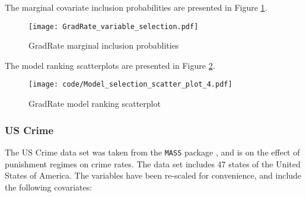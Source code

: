 \documentclass{amsart}[12pt]
\begin{document}
The marginal covariate inclusion probabilities are presented in Figure \ref{fig:GradRate_inclusion}.


\begin{figure}[p]
	\texttt{[image: GradRate\_variable\_selection.pdf]}
	\caption{GradRate marginal inclusion probablities}
	\label{fig:GradRate_inclusion}
\end{figure}

The model ranking scatterplots are presented in Figure \ref{fig:GradRate_model_ranking}.

\begin{figure}[p]
	\texttt{[image: code/Model\_selection\_scatter\_plot\_4.pdf]}
	\caption{GradRate model ranking scatterplot}
	\label{fig:GradRate_model_ranking}
\end{figure}

\subsubsection{US Crime}
The US Crime data set was taken from the \texttt{MASS} package \citep{Venables2002}, and is on the effect of
punishment regimes on crime rates. The data set includes 47 states of the United States of America. The
variables have been re-scaled for convenience, and include the following covariates:
\end{document}
